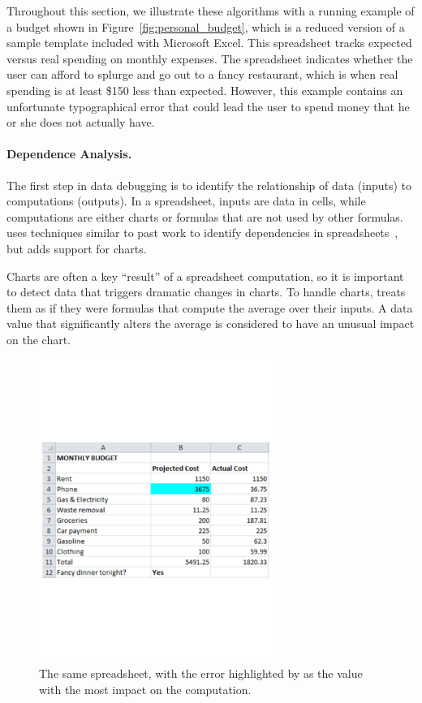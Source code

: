 Throughout this section, we illustrate these algorithms with a running
example of a budget shown in Figure~\ref{fig:personal_budget}, which
is a reduced version of a sample template included with Microsoft Excel. This
spreadsheet tracks expected versus real spending on monthly
expenses. The spreadsheet indicates whether the user can afford to
splurge and go out to a fancy restaurant, which is when real spending
is at least \$150 less than expected. However, this example contains
an unfortunate typographical error that could lead the user to spend
money that he or she does not actually have.


\paragraph{Dependence Analysis.}
The first step in data debugging is to identify the relationship of
data (inputs) to computations (outputs).
In a spreadsheet, inputs are data in cells, while computations are
either charts or formulas that are not used by other formulas.
\checkcell{} uses techniques similar to past work to identify
dependencies in spreadsheets~\cite{fisher2006scaling}, but adds
support for charts.

Charts are often a key ``result'' of a spreadsheet computation, so it
is important to detect data that triggers dramatic changes in
charts. To handle charts, \checkcell{} treats them as if they were
formulas that compute the average over their inputs. A data value that
significantly alters the average is considered to have an
unusual impact on the chart.

\begin{figure}[!t]
\centering
\includegraphics[width=3in]{overview-example-highlighted}
  \caption{The same spreadsheet, with the error highlighted by \checkcell{} as the value with the most impact on the computation.\label{fig:personal_budget_highlighted}}
\end{figure}

